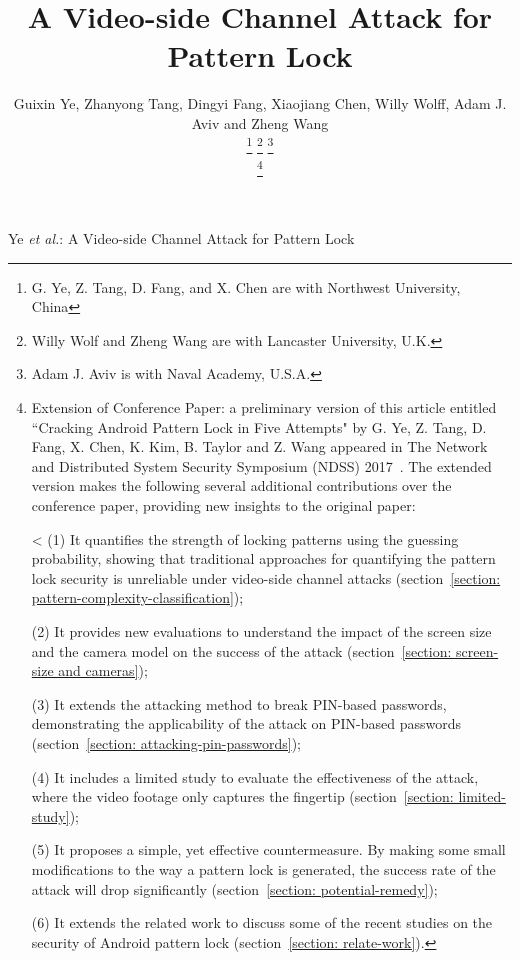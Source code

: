 \documentclass[journal,table,twoside]{IEEEtran}
\begin{document}
\title{A Video-side Channel Attack for Pattern Lock}
\author{Guixin Ye, Zhanyong Tang, Dingyi Fang, Xiaojiang Chen,
        Willy Wolff, Adam J. Aviv and Zheng Wang

    \thanks{G. Ye, Z. Tang, D. Fang, and X. Chen are with Northwest University, China}%
    \thanks{Willy Wolf and Zheng Wang are with Lancaster University, U.K.}
    \thanks{Adam J. Aviv is with Naval Academy, U.S.A.}

    \thanks{
            Extension of Conference Paper: a preliminary version of this article entitled ``Cracking Android Pattern Lock
            in Five Attempts" by G. Ye, Z. Tang, D. Fang, X. Chen, K. Kim, B. Taylor and Z. Wang appeared in
            The Network and Distributed System Security Symposium (NDSS) 2017~\cite{ye2017cracking}.
            The extended version makes the following several additional contributions over the conference
            paper, providing new insights to the original paper:


<
            (1)	It quantifies the strength of locking patterns using the guessing probability, showing that traditional approaches for quantifying the pattern lock security is unreliable under video-side channel attacks (section~\ref{section: pattern-complexity-classification});


            (2)	It provides new evaluations to understand the impact of the screen size and the camera model on the success of the attack (section~\ref{section: screen-size and cameras});

            (3)	It extends the attacking method to break PIN-based passwords, demonstrating the applicability of the attack on PIN-based passwords (section~\ref{section: attacking-pin-passwords});

            (4)	It includes a limited study to evaluate the effectiveness of the attack, where the video footage only captures the fingertip (section~\ref{section: limited-study});


            (5)	It proposes a simple, yet effective countermeasure. By making some small modifications to the way a pattern lock is generated, the success rate of the attack will drop significantly (section~\ref{section: potential-remedy});


            (6)	It extends the related work to discuss some of the recent studies on the security of Android pattern lock (section~\ref{section: relate-work}).

    }
}

%
{Ye \MakeLowercase{\textit{et al.}}: A Video-side Channel Attack for Pattern Lock}
\end{document}
